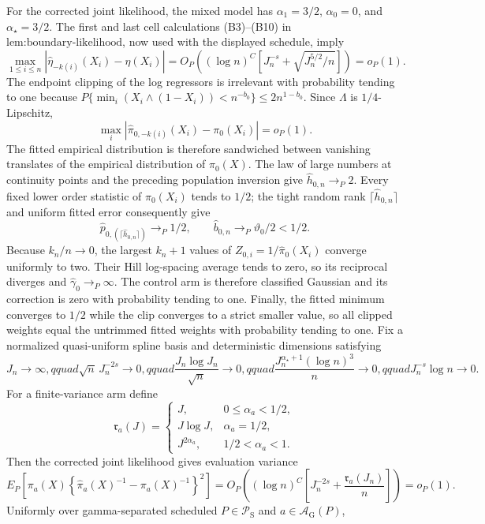 For the corrected joint likelihood, the mixed model has \(\alpha_1=3/2\), \(\alpha_0=0\), and \(\alpha_\star=3/2\).  The first and last cell calculations (B3)--(B10) in \(\text{lem:boundary-likelihood}\), now used with the displayed schedule, imply
\[
 \max_{1\le i\le n}|\widehat\eta_{-k(i)}(X_i)-\eta(X_i)|
 =O_P\!\left((\log n)^C\left[J_n^{-s}+\sqrt{J_n^{5/2}/n}\right]\right)=o_P(1).
\]
The endpoint clipping of the log regressors is irrelevant with probability tending to one because \(P\{\min_i(X_i\wedge(1-X_i))<n^{-b_0}\}\le2n^{1-b_0}\).  Since \(\Lambda\) is \(1/4\)-Lipschitz,
\[
 \max_i|\widehat\pi_{0,-k(i)}(X_i)-\pi_0(X_i)|=o_P(1).
\]
The fitted empirical distribution is therefore sandwiched between vanishing translates of the empirical distribution of \(\pi_0(X)\).  The law of large numbers at continuity points and the preceding population inversion give \(\widehat h_{0,n}\to_P2\).  Every fixed lower order statistic of \(\pi_0(X_i)\) tends to \(1/2\); the tight random rank \(\lceil\widehat h_{0,n}\rceil\) and uniform fitted error consequently give
\[
 \widehat p_{0,(\lceil\widehat h_{0,n}\rceil)}\to_P1/2,
 \qquad \widehat b_{0,n}\to_P\vartheta_0/2<1/2.
\]
Because \(k_n/n\to0\), the largest \(k_n+1\) values of \(Z_{0,i}=1/\widehat\pi_0(X_i)\) converge uniformly to two.  Their Hill log-spacing average tends to zero, so its reciprocal diverges and \(\widehat\gamma_0\to_P\infty\).  The control arm is therefore classified Gaussian and its correction is zero with probability tending to one.  Finally, the fitted minimum converges to \(1/2\) while the clip converges to a strict smaller value, so all clipped weights equal the untrimmed fitted weights with probability tending to one.
Fix a normalized quasi-uniform spline basis and deterministic dimensions satisfying
\[
 J_n\to\infty,qquad
 \sqrt n\,J_n^{-2s}\to0,qquad
 \frac{J_n\log J_n}{\sqrt n}\to0,qquad
 \frac{J_n^{\alpha_\star+1}(\log n)^3}{n}\to0,qquad
 J_n^{-s}\log n\to0.
\]
For a finite-variance arm define
\[
 \mathfrak r_{a}(J)=
 \begin{cases}
 J,&0\le\alpha_a<1/2,\\
 J\log J,&\alpha_a=1/2,\\
 J^{2\alpha_a},&1/2<\alpha_a<1.
 \end{cases}
\]
Then the corrected joint likelihood gives evaluation variance
\[
 E_P\!\left[\pi_a(X)\left\{\widehat\pi_a(X)^{-1}-\pi_a(X)^{-1}\right\}^2\right]
 =O_P\!\left((\log n)^C\left[J_n^{-2s}+\frac{\mathfrak r_a(J_n)}n\right]\right)=o_P(1).
\]
Uniformly over gamma-separated scheduled \(P\in\mathcal P_{\mathrm S}\) and \(a\in\mathcal A_{\mathrm G}(P)\),
